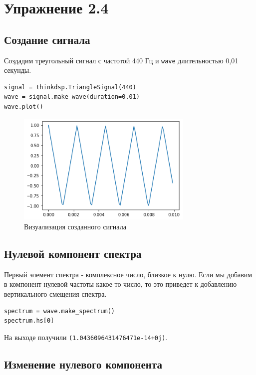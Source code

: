 \documentclass[a4paper,12pt]{report}
\begin{document}
\chapter{Упражнение 2.4}
\section{Создание сигнала}

Создадим треугольный сигнал с частотой 440 Гц и \texttt{wave} длительностью 0,01 секунды.

\begin{lstlisting}[caption=Создание треугольного сигнала]
signal = thinkdsp.TriangleSignal(440)
wave = signal.make_wave(duration=0.01)
wave.plot()
\end{lstlisting}

\begin{figure}[H]
        \centering
        \includegraphics[width=0.75\textwidth]{4.png}
        \caption{Визуализация созданного сигнала}
        \label{fig:ig4_1}
\end{figure}

\section{Нулевой компонент спектра}

Первый элемент спектра - комплексное число, близкое к нулю. Если мы добавим в компонент нулевой частоты какое-то число, то это приведет к добавлению вертикального смещения спектра.

\begin{lstlisting}[caption=Вывод нулевого компонента]
spectrum = wave.make_spectrum()
spectrum.hs[0]
\end{lstlisting}

На выходе получили \texttt{(1.0436096431476471e-14+0j)}.

\section{Изменение нулевого компонента}
\end{document}
